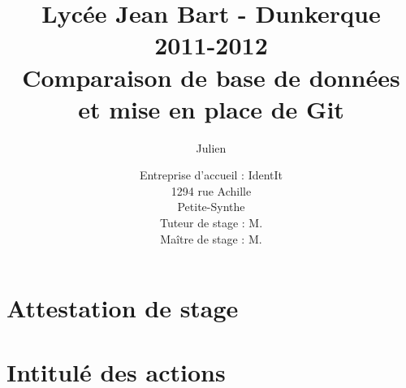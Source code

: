 \documentclass[12pt,a4paper]{report}
\title
{
	\normalsize{Lycée Jean Bart - Dunkerque\\
	2011-2012}\\
	\vspace{15mm}
	\Huge{Comparaison de base de données\\
    et mise en place de Git\\
    \vspace{15mm}}
}
\author{\bsc{Stechele} Julien\\
	\vspace{45mm}
}
\date{
	\normalsize{Entreprise d'accueil : IdentIt\\
    1294 rue Achille \bsc{Pérès}\\
	Petite-Synthe\\
	\vspace{5mm}
    Tuteur de stage : M.\bsc{Anselin}\\
	Maître de stage : M.\bsc{Dubourg}
	}
}%
\begin{document}
\maketitle



\renewcommand{\contentsname}{Sommaire}

{\setlength{\baselineskip}{1.2\baselineskip}
\tableofcontents\par}









\appendix

\chapter{Attestation de stage} %
\label{cha:Attestation de stage}

\chapter{Intitulé des actions} %
\label{cha:Intitulé des actions}
\end{document}

